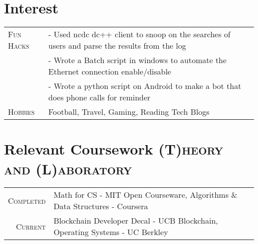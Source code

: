 \documentclass[a4paper,10pt]{extarticle} %
\begin{document}
\section{\textcolor{primary}{Interest}}
\begin{tabularx}{\linewidth}{ l | X }

\item \textsc{{Fun Hacks}} & {- Used ncdc dc++ client to snoop on the searches of users and parse the results from the log  }\\
\textsc& {- Wrote a Batch script in windows to automate the Ethernet connection enable/disable }\\
\textsc& {- Wrote a python script on Android to make a bot that does phone calls for reminder }\\

\textsc{Hobbies} & {Football, Travel, Gaming, Reading Tech Blogs}\\


\end{tabularx}


\vspace{-0.05cm}
\section{\textcolor{primary}{Relevant Coursework}
\hfill\small\textsc{(T)heory and (L)aboratory}}

\begin{tabular}{r|p{15cm}}
\textsc{Completed} & Math for CS - MIT Open Courseware, Algorithms \& Data Structures - Coursera  \\
\textsc{Current} & Blockchain Developer Decal - UCB Blockchain, Operating Systems - UC Berkley
\end{tabular}

\end{document}
